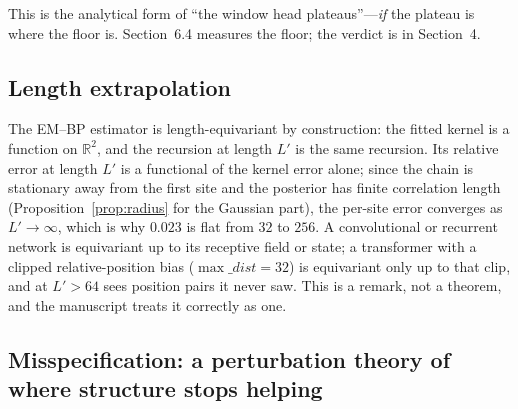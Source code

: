 \documentclass[11pt,a4paper]{article}
\newcommand{\R}{\mathbb{R}}
\theoremstyle{definition}
\theoremstyle{remark}
\begin{document}
\noindent This is the analytical form of ``the window head plateaus''---\emph{if} the plateau is where the floor is. Section~6.4 measures the floor; the verdict is in Section~4.

\subsection{Length extrapolation}

The EM--BP estimator is length-equivariant by construction: the fitted kernel is a function on $\R^2$, and the recursion at length $L'$ is the same recursion. Its relative error at length $L'$ is a functional of the kernel error alone; since the chain is stationary away from the first site and the posterior has finite correlation length (Proposition~\ref{prop:radius} for the Gaussian part), the per-site error converges as $L'\to\infty$, which is why $0.023$ is flat from $32$ to $256$. A convolutional or recurrent network is equivariant up to its receptive field or state; a transformer with a clipped relative-position bias ($\max\_dist=32$) is equivariant only up to that clip, and at $L'>64$ sees position pairs it never saw. This is a remark, not a theorem, and the manuscript treats it correctly as one.

\subsection{Misspecification: a perturbation theory of where structure stops helping}
\end{document}
